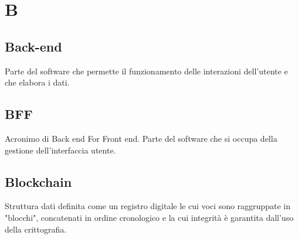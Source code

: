 \section*{B}
\markright{}
\subsection*{Back-end}
Parte del software che permette il funzionamento delle interazioni dell'utente e che elabora i dati.
\subsection*{BFF}
Acronimo di Back end For Front end. Parte del software che si occupa della gestione dell'interfaccia utente.
\subsection*{Blockchain}
Struttura dati definita come un registro digitale le cui voci sono raggruppate in "blocchi", concatenati in ordine cronologico e la cui integrità è garantita dall'uso della crittografia.